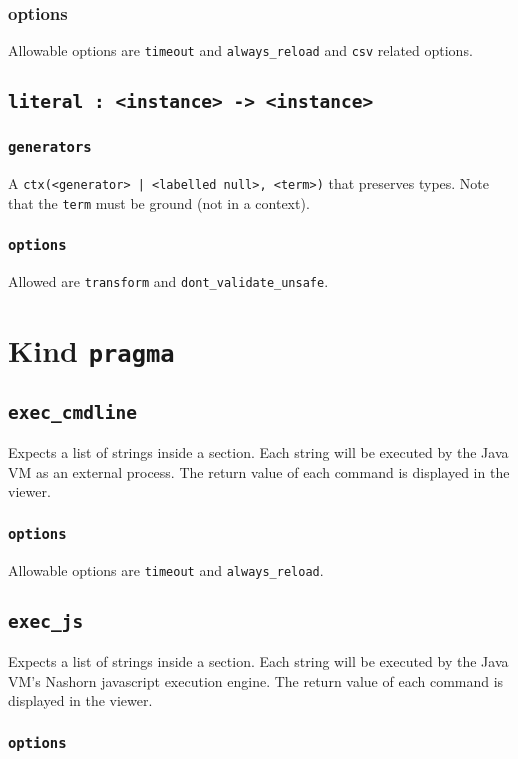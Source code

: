 \documentclass[10pt]{book}
\begin{document}
\subsection{options}
Allowable options are {\tt timeout} and {\tt always\_reload}  and {\tt csv} related options. 

\section{{\tt literal : <instance> -> <instance>}}

\subsection{{\tt generators}}
A {\tt ctx(<generator> | <labelled null>, <term>)} that preserves types.  Note that the {\tt term} must be ground (not in a context).  

\subsection{{\tt options}}
Allowed are {\tt transform} and {\tt dont\_validate\_unsafe}.

\chapter{Kind {\tt pragma}}
\section{{\tt exec\_cmdline}}
Expects a list of strings inside a section.  Each string will be executed by the Java VM as an external process.  The return value of each command is displayed in the viewer.

\subsection{{\tt options}}

Allowable options are {\tt timeout} and {\tt always\_reload}.

\section{{\tt exec\_js}} 
Expects a list of strings inside a section.  Each string will be executed by the Java VM's Nashorn javascript execution engine.  The return value of each command is displayed in the viewer.

\subsection{{\tt options}}
\end{document}
